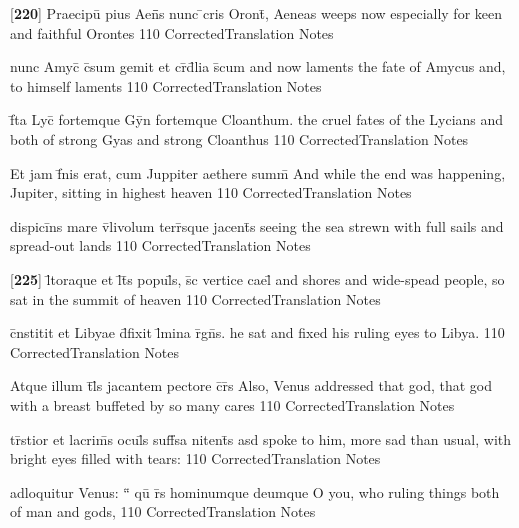 \documentclass[]{book}
\begin{document}
\latline
  {[\textbf{220}] Praecipu\={} pius Aen\={}\={}s nunc \={}cris Oront\={\macron {\i}},}
  { Aeneas weeps now especially for keen and faithful Orontes }
  {110}
  { CorrectedTranslation }
  { Notes }


\latline
  {nunc Amyc\={\macron {\i}} c\={}sum gemit et cr\={}d\={}lia s\={}cum}
  { and now laments the fate of Amycus and, to himself laments }
  {110}
  { CorrectedTranslation }
  { Notes }


\latline
  {f\={}ta Lyc\={\macron {\i}} fortemque Gy\={}n fortemque Cloanthum.}
  { the cruel fates of the Lycians and both of strong Gyas and strong Cloanthus }
  {110}
  { CorrectedTranslation }
  { Notes }


\latline
  {Et jam f\={\macron {\i}}nis erat, cum Juppiter aethere summ\={}}
  { And while the end was happening, Jupiter, sitting in highest heaven }
  {110}
  { CorrectedTranslation }
  { Notes }


\latline
  {dispici\={}ns mare v\={}livolum terr\={}sque jacent\={\macron {\i}}s}
  { seeing the sea strewn with full sails and spread-out lands }
  {110}
  { CorrectedTranslation }
  { Notes }


\latline
  {[\textbf{225}] l\={\macron {\i}}toraque et l\={}t\={}s popul\={}s, s\={\macron {\i}}c vertice cael\={\macron {\i}}}
  { and shores and wide-spead people, so sat in the summit of heaven }
  {110}
  { CorrectedTranslation }
  { Notes }


\latline
  {c\={}nstitit et Libyae d\={}fixit l\={}mina r\={}gn\={\macron {\i}}s.}
  { he sat and fixed his ruling eyes to Libya. }
  {110}
  { CorrectedTranslation }
  { Notes }


\latline
  {Atque illum t\={}l\={\macron {\i}}s jacantem pectore c\={}r\={}s}
  { Also, Venus addressed that god, that god with a breast buffeted by so many cares }
  {110}
  { CorrectedTranslation }
  { Notes }


\latline
  {tr\={\macron {\i}}stior et lacrim\={\macron {\i}}s ocul\={}s suff\={}sa nitent\={\macron {\i}}s}
  { asd spoke to him, more sad than usual, with bright eyes filled with tears: }
  {110}
  { CorrectedTranslation }
  { Notes }


\latline
  {adloquitur Venus: ``\={} qu\={\macron {\i}} r\={}s hominumque deumque}
  { O you, who ruling things both of man and gods, }
  {110}
  { CorrectedTranslation }
  { Notes }
\end{document}
